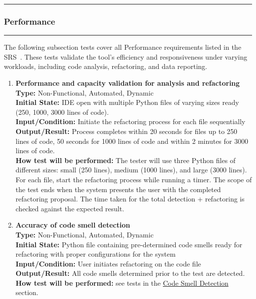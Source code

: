 \documentclass[12pt, titlepage]{article}
\newcommand{\colorrule}{\textcolor{BlueViolet}{\rule{\linewidth}{2pt}}}
\begin{document}
  \noindent
  \textcolor{Blue}{\colorrule}

  \subsubsection{Performance}
  \colorrule

  \medskip

  \noindent
  The following subsection tests cover all Performance requirements
  listed in the SRS~\cite{SRS}. These tests validate the tool’s
  efficiency and responsiveness under varying workloads, including
  code analysis, refactoring, and data reporting.

  \begin{enumerate}[label={\bf \textcolor{Maroon}{test-PF-\arabic*}},
      wide=0pt, font=\itshape]
    \item \textbf{Performance and capacity validation for analysis
      and refactoring} \\[2mm]
      \textbf{Type:} Non-Functional, Automated, Dynamic \\
      \textbf{Initial State:} IDE open with multiple Python files of
      varying sizes ready (250, 1000, 3000 lines of code). \\
      \textbf{Input/Condition:} Initiate the refactoring process for
      each file sequentially \\
      \textbf{Output/Result:} Process completes within 20 seconds for
      files up to 250 lines of code, 50 seconds for 1000 lines of
      code and within 2 minutes for 3000 lines of code. \\[2mm]
      \textbf{How test will be performed:} The tester will use three
      Python files of different sizes: small (250 lines), medium
      (1000 lines), and
      large (3000 lines). For each file, start the refactoring
      process while running a timer.
      The scope of the test ends when the system presents the user
      with the completed refactoring proposal.
      The time taken for the total detection + refactoring is checked
      against the expected result.

    \item \textbf{Accuracy of code smell detection} \\[2mm]
      \textbf{Type:} Non-Functional, Automated, Dynamic \\
      \textbf{Initial State:} Python file containing pre-determined
      code smells ready for refactoring with proper configurations
      for the system \\
      \textbf{Input/Condition:} User initiates refactoring on the code file \\
      \textbf{Output/Result:} All code smells determined prior to the
      test are detected. \\[2mm]
      \textbf{How test will be performed:} see tests in the
      \hyperref[4.1.2]{Code Smell Detection} section.


\end{enumerate}
\end{document}
